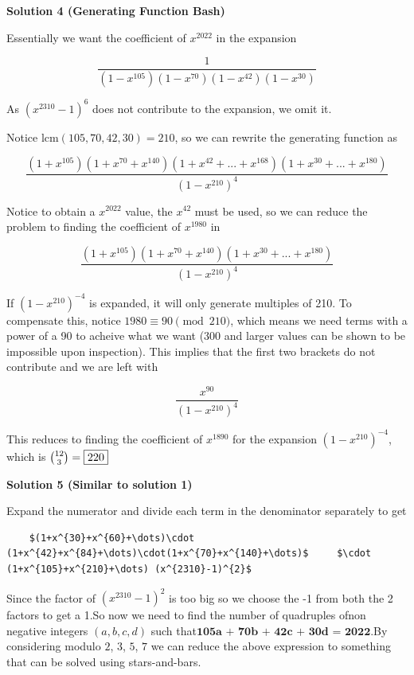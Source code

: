 \begin{enumerate}
 



\textbf{Solution 4 (Generating Function Bash)}

Essentially we want the coefficient of $x^{2022}$ in the expansion

 
 \[\frac{1}{(1 - x^{105})(1 - x^{70})(1 - x^{42})(1 - x^{30})}\]

 As $(x^{2310} -1)^{6}$ does not contribute to the expansion, we omit it.

 Notice $\text{lcm}(105,70,42,30) = 210$, so we can rewrite the generating function as

 

 \[\frac{(1 + x^{105})(1 + x^{70} + x^{140})(1 + x^{42} + ... + x^{168})(1 + x^{30} + ... + x^{180})}{(1-x^{210})^{4}}\]

 Notice to obtain a $x^{2022}$ value, the $x^{42}$ must be used, so we can reduce the problem to finding the coefficient of $x^{1980}$ in 

 
 \[\frac{(1 + x^{105})(1 + x^{70} + x^{140})(1 + x^{30} + ... + x^{180})}{(1-x^{210})^{4}}\]

 If $(1 - x^{210})^{-4}$ is expanded, it will only generate multiples of 210. To compensate this, notice $1980 \equiv 90 \pmod{210}$, which means we need terms with a power of a 90 to acheive what we want (300 and larger values can be shown to be impossible upon inspection). This implies that the first two brackets do not contribute and we are left with

 
 \[\frac{x^{90}}{(1-x^{210})^{4}}\]

 This reduces to finding the coefficient of $x^{1890}$ for the expansion $(1 - x^{210})^{-4}$, which is $\binom{12}{3} = \fbox{220}$




\textbf{Solution 5 (Similar to solution 1)}

Expand the numerator and divide each term in the denominator separately to get 

 \begin{verbatim}
	$(1+x^{30}+x^{60}+\dots)\cdot         (1+x^{42}+x^{84}+\dots)\cdot(1+x^{70}+x^{140}+\dots)$     $\cdot (1+x^{105}+x^{210}+\dots) (x^{2310}-1)^{2}$
\end{verbatim}

Since the factor of $(x^{2310}-1)^{2}$ is too big so we choose the -1 from both the 2 factors to get a 1.So now we need to find the number of quadruples ofnon negative integers $(a,b,c,d)$ such that$\textbf{105a + 70b + 42c + 30d = 2022}$.By considering modulo $2$, $3$, $5$, $7$ we can reduce the above expression to something that can be solved using stars-and-bars. 


\end{enumerate}
